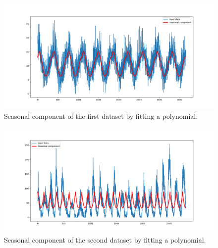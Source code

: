 \begin{figure}[H]
    \centering
    \begin{minipage}[b]{1\textwidth}
        \includegraphics[width=\textwidth]{figures/Ass1/Ass1_D1_fiting_polynomial.png}
    \end{minipage}
    \caption{Seasonal component of the first dataset by fitting a polynomial.}
    \label{fig:Ass1_D1_fiting_polynomial}
\end{figure}

\begin{figure}[H]
    \centering
    \begin{minipage}[b]{1\textwidth}
        \includegraphics[width=\textwidth]{figures/Ass1/Ass1_D2_fiting_polynomial.png}
    \end{minipage}
    \caption{Seasonal component of the second dataset by fitting a polynomial.}
    \label{fig:Ass1_D2_fiting_polynomial}
\end{figure}

